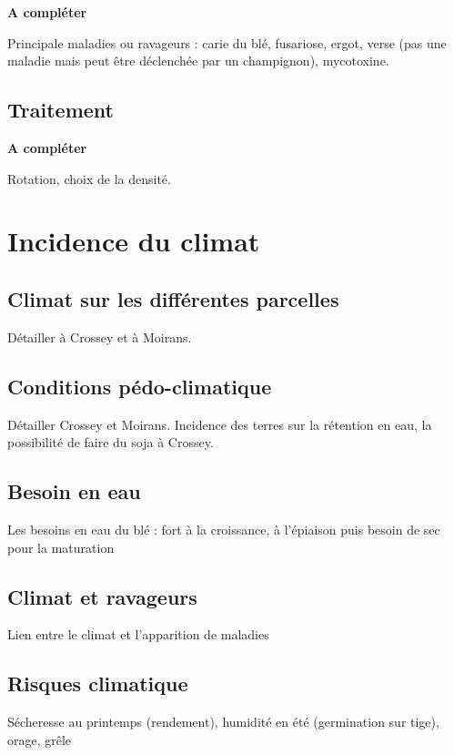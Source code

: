 \documentclass{article}
\begin{document}
\textbf{A compléter}

Principale maladies ou ravageurs : carie du blé, fusariose, ergot, verse (pas une maladie mais peut être déclenchée par un champignon), mycotoxine.

\subsection{Traitement}

\textbf{A compléter}

Rotation, choix de la densité. 

\section{Incidence du climat}

\subsection{Climat sur les différentes parcelles}

Détailler à Crossey et à Moirans. 

\subsection{Conditions pédo-climatique}

Détailler Crossey et Moirans. Incidence des terres sur la rétention en eau, la possibilité de faire du soja à Crossey.

\subsection{Besoin en eau}

Les besoins en eau du blé : fort à la croissance, à l'épiaison puis besoin de sec pour la maturation

\subsection{Climat et ravageurs}

Lien entre le climat et l'apparition de maladies

\subsection{Risques climatique}

Sécheresse au printemps (rendement), humidité en été (germination sur tige), orage, grêle
\end{document}

